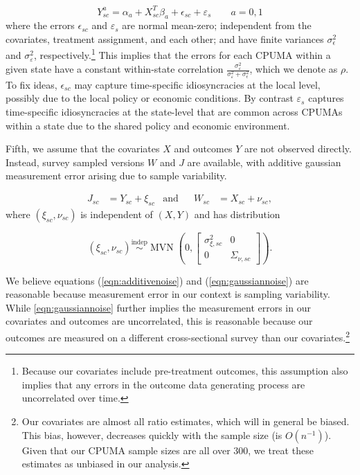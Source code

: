 \documentclass[aoas]{imsart}
\theoremstyle{plain}
\theoremstyle{remark}
\begin{document}
\begin{equation}\label{eqn:linmod}
Y_{sc}^a = \alpha_a + X_{sc}^T\beta_a + \epsilon_{sc} + \varepsilon_s \qquad a = 0, 1
\end{equation}
where the errors $\epsilon_{sc}$ and $\varepsilon_{s}$ are normal mean-zero; independent from the covariates, treatment assignment, and each other; and have finite variances $\sigma^2_{\epsilon}$ and $\sigma^2_{\varepsilon}$, respectively.\footnote{Because our covariates include pre-treatment outcomes, this assumption also implies that any errors in the outcome data generating process are uncorrelated over time.} This implies that the errors for each CPUMA within a given state have a constant within-state correlation $\frac{\sigma^2_{\varepsilon}}{\sigma^2_{\varepsilon} + \sigma^2_{\epsilon}}$, which we denote as $\rho$. To fix ideas, $\epsilon_{sc}$ may capture time-specific idiosyncracies at the local level, possibly due to the local policy or economic conditions. By contrast $\varepsilon_s$ captures time-specific idiosyncracies at the state-level that are common across CPUMAs within a state due to the shared policy and economic environment.

Fifth, we assume that the covariates $X$ and outcomes $Y$ are not observed directly. Instead, survey sampled versions $W$ and $J$ are available, with additive gaussian measurement error arising due to sample variability.

\begin{align} \label{eqn:additivenoise}
	J_{sc} & = Y_{sc} + \xi_{sc} & \text{and} & & W_{sc} & = X_{sc} + \nu_{sc},
\end{align}
where $(\xi_{sc}, \nu_{sc})$ is independent of $(X, Y)$ and has distribution

\begin{equation} \label{eqn:gaussiannoise}
 (\xi_{sc}, \nu_{sc}) \stackrel{\text{indep}}{\sim} \operatorname{MVN}\left(0, \left[\begin{array}{cc} \sigma_{\xi,sc}^2 & 0 \\ 0 & \Sigma_{\nu, sc} \end{array}\right] \right).
\end{equation}

We believe equations (\ref{eqn:additivenoise}) and (\ref{eqn:gaussiannoise}) are reasonable because measurement error in our context is sampling variability. While \eqref{eqn:gaussiannoise} further implies the measurement errors in our covariates and outcomes are uncorrelated, this is reasonable because our outcomes are measured on a different cross-sectional survey than our covariates.\footnote{Our covariates are almost all ratio estimates, which will in general be biased. This bias, however, decreases quickly with the sample size (is $O(n^{-1})$). Given that our CPUMA sample sizes are all over 300, we treat these estimates as unbiased in our analysis.} 
\end{document}

